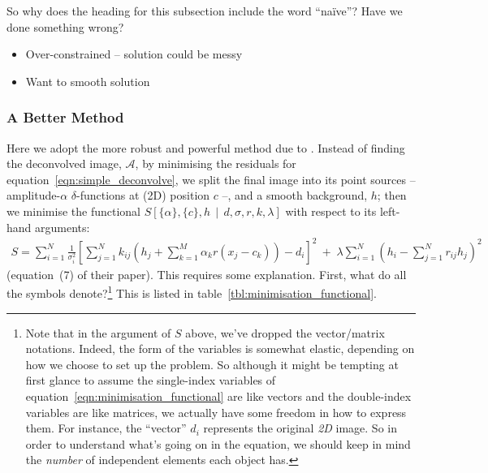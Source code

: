 \documentclass[letterpaper, 11pt]{article}
\begin{document}
So why does the heading for this subsection include the word ``na\"ive''? Have we done something wrong?
\begin{itemize}
	\item Over-constrained -- solution could be messy
	\item Want to smooth solution
\end{itemize}


\subsubsection{A Better Method}

Here we adopt the more robust and powerful method due to \citet{MCS98}. Instead of finding the deconvolved image, $\mathcal A$, by minimising the residuals for equation~\ref{eqn:simple_deconvolve}, we split the final image into its point sources -- amplitude-$\alpha$ $\delta$-functions at (2D) position $c$ --, and a smooth background, $h$; then we minimise the functional $S\left[\{\alpha\},\{c\}, h \,\middle|\, {d}, {\sigma}, {r}, {k}, \lambda \right]$ with respect to its left-hand arguments:
\begin{align}
	S = \sum_{i=1}^N \frac{1}{\sigma_i^2} \left[ \sum_{j=1}^N k_{ij} \left(h_j +\sum_{k=1}^M \alpha_k r(x_j-c_k)\right) - d_i \right]^2\
			+\; \lambda\sum_{i=1}^N \left( h_i - \sum_{j=1}^N r_{ij}h_j \right)^2 \label{eqn:minimisation_functional}
\end{align}
(equation~(7) of their paper). This requires some explanation. First, what do all the symbols denote?\footnote{Note that in the argument of $S$ above, we've dropped the vector/matrix notations. Indeed, the form of the variables is somewhat elastic, depending on how we choose to set up the problem. So although it might be tempting at first glance to assume the single-index variables of equation~\ref{eqn:minimisation_functional} are like vectors and the double-index variables are like matrices, we actually have some freedom in how to express them. For instance, the ``vector'' $d_i$ represents the original \emph{2D} image. So in order to understand what's going on in the equation, we should keep in mind the \emph{number} of independent elements each object has.} This is listed in table~\ref{tbl:minimisation_functional}.
\end{document}
